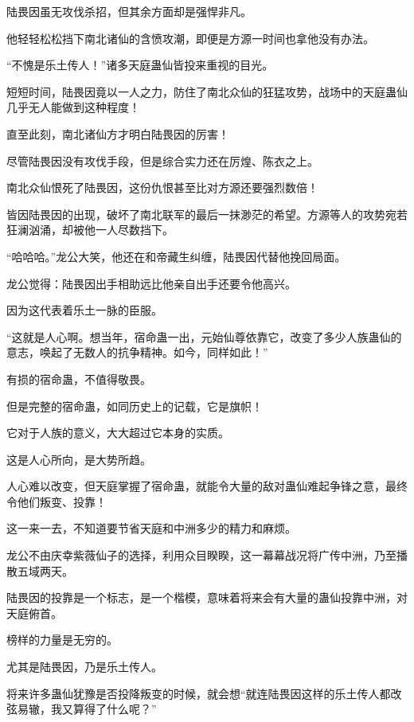
\begin{this_body}



陆畏因虽无攻伐杀招，但其余方面却是强悍非凡。

他轻轻松松挡下南北诸仙的含愤攻潮，即便是方源一时间也拿他没有办法。

“不愧是乐土传人！”诸多天庭蛊仙皆投来重视的目光。

短短时间，陆畏因竟以一人之力，防住了南北众仙的狂猛攻势，战场中的天庭蛊仙几乎无人能做到这种程度！

直至此刻，南北诸仙方才明白陆畏因的厉害！

尽管陆畏因没有攻伐手段，但是综合实力还在厉煌、陈衣之上。

南北众仙恨死了陆畏因，这份仇恨甚至比对方源还要强烈数倍！

皆因陆畏因的出现，破坏了南北联军的最后一抹渺茫的希望。方源等人的攻势宛若狂澜汹涌，却被他一人尽数挡下。

“哈哈哈。”龙公大笑，他还在和帝藏生纠缠，陆畏因代替他挽回局面。

龙公觉得：陆畏因出手相助远比他亲自出手还要令他高兴。

因为这代表着乐土一脉的臣服。

“这就是人心啊。想当年，宿命蛊一出，元始仙尊依靠它，改变了多少人族蛊仙的意志，唤起了无数人的抗争精神。如今，同样如此！”

有损的宿命蛊，不值得敬畏。

但是完整的宿命蛊，如同历史上的记载，它是旗帜！

它对于人族的意义，大大超过它本身的实质。

这是人心所向，是大势所趋。

人心难以改变，但天庭掌握了宿命蛊，就能令大量的敌对蛊仙难起争锋之意，最终令他们叛变、投靠！

这一来一去，不知道要节省天庭和中洲多少的精力和麻烦。

龙公不由庆幸紫薇仙子的选择，利用众目睽睽，这一幕幕战况将广传中洲，乃至播散五域两天。

陆畏因的投靠是一个标志，是一个楷模，意味着将来会有大量的蛊仙投靠中洲，对天庭俯首。

榜样的力量是无穷的。

尤其是陆畏因，乃是乐土传人。

将来许多蛊仙犹豫是否投降叛变的时候，就会想“就连陆畏因这样的乐土传人都改弦易辙，我又算得了什么呢？”


\end{this_body}

